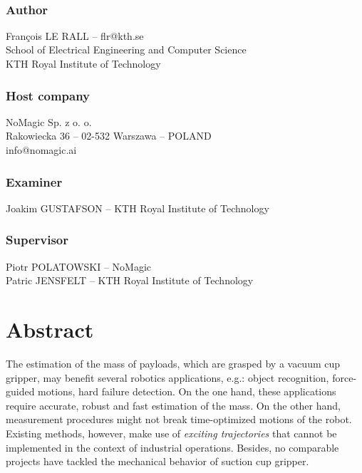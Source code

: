 \documentclass[/home/francois/latex/report/main.tex]{subfiles}
\begin{document}
\newpage
\thispagestyle{plain}

~

\vfill

{ 
	\subsection*{Author}
	François LE RALL – flr@kth.se\\
	School of Electrical Engineering and Computer Science\\
	KTH Royal Institute of Technology

	\subsection*{Host company}
	NoMagic Sp. z o. o.\\
	Rakowiecka 36 – 02-532 Warszawa – POLAND\\
	info@nomagic.ai

	\subsection*{Examiner}
	Joakim GUSTAFSON – KTH Royal Institute of Technology

	\subsection*{Supervisor}
	Piotr POLATOWSKI – NoMagic\\
	Patric JENSFELT – KTH Royal Institute of Technology
	~
}


\newpage
\thispagestyle{plain}
\chapter*{Abstract}

The estimation of the mass of payloads, which are grasped by a vacuum cup gripper, may benefit several robotics applications, e.g.: object recognition, force-guided motions, hard failure detection. On the one hand, these applications require accurate, robust and fast estimation of the mass. On the other hand, measurement procedures might not break time-optimized motions of the robot. Existing methods, however, make use of \textit{exciting trajectories} that cannot be implemented in the context of industrial operations. Besides, no comparable projects have tackled the mechanical behavior of suction cup gripper.
\end{document}
